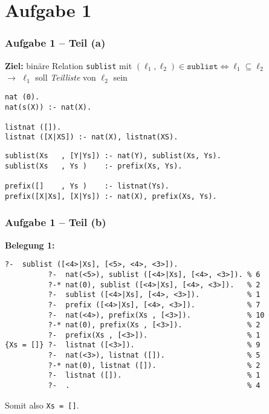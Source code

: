 \documentclass{beamer}
\begin{document}


\section{Aufgabe 1}


\begin{frame}[fragile] \frametitle{Aufgabe 1 -- Teil (a)}
	
	\textbf{Ziel:} binäre Relation \texttt{sublist} mit $(\ell_1 , \ell_2) \in \texttt{sublist} \Leftrightarrow \ell_1 \subseteq \ell_2$ \\
	$\to$ $\ell_1$ soll \textit{Teilliste} von $\ell_2$ sein
	
	\begin{lstlisting}
nat (0).
nat(s(X)) :- nat(X).

listnat ([]).
listnat ([X|XS]) :- nat(X), listnat(XS).

	\end{lstlisting}
	\pause
	\begin{lstlisting}[firstnumber=6]
sublist(Xs   , [Y|Ys]) :- nat(Y), sublist(Xs, Ys). 
sublist(Xs   , Ys )    :- prefix(Xs, Ys). 

prefix([]    , Ys )    :- listnat(Ys). 
prefix([X|Xs], [X|Ys]) :- nat(X), prefix(Xs, Ys).
	\end{lstlisting}
\end{frame}

\begin{frame}[fragile] \frametitle{Aufgabe 1 -- Teil (b)}
	\textbf{Belegung 1:}
	
	\begin{lstlisting}[style=refutation, basicstyle=\ttfamily\scriptsize]
          ?-  sublist ([<4>|Xs], [<5>, <4>, <3>]).
          ?-  nat(<5>), sublist ([<4>|Xs], [<4>, <3>]). % 6
          ?-* nat(0), sublist ([<4>|Xs], [<4>, <3>]).   % 2
          ?-  sublist ([<4>|Xs], [<4>, <3>]).           % 1
          ?-  prefix ([<4>|Xs], [<4>, <3>]).            % 7
          ?-  nat(<4>), prefix(Xs , [<3>]).             % 10
          ?-* nat(0), prefix(Xs , [<3>]).               % 2
          ?-  prefix(Xs , [<3>]).                       % 1
{Xs = []} ?-  listnat ([<3>]).                          % 9
          ?-  nat(<3>), listnat ([]).                   % 5
          ?-* nat(0), listnat ([]).                     % 2
          ?-  listnat ([]).                             % 1
          ?-  .                                         % 4
	\end{lstlisting}
	Somit also \texttt{Xs = []}.
\end{frame}
\end{document}
